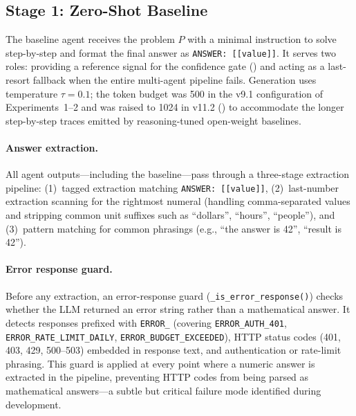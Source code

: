 \documentclass[11pt,a4paper]{article}
\begin{document}
\subsection{Stage 1: Zero-Shot Baseline}
\label{sec:baseline}
The baseline agent receives the problem $P$ with a minimal instruction to solve step-by-step and format the final answer as \texttt{ANSWER:~[[value]]}.
It serves two roles: providing a reference signal for the confidence gate () and acting as a last-resort fallback when the entire multi-agent pipeline fails.
Generation uses temperature $\tau=0.1$; the token budget was 500 in the v9.1 configuration of Experiments~1--2 and was raised to 1024 in v11.2 () to accommodate the longer step-by-step traces emitted by reasoning-tuned open-weight baselines.
\paragraph{Answer extraction.}
All agent outputs---including the baseline---pass through a three-stage extraction pipeline:
(1)~tagged extraction matching \texttt{ANSWER:~[[value]]},
(2)~last-number extraction scanning for the rightmost numeral (handling comma-separated values and stripping common unit suffixes such as ``dollars'', ``hours'', ``people''), and
(3)~pattern matching for common phrasings (e.g., ``the answer is 42'', ``result is 42'').
\paragraph{Error response guard.}
Before any extraction, an error-response guard (\texttt{\_is\_error\_response()}) checks whether the LLM returned an error string rather than a mathematical answer.
It detects responses prefixed with \texttt{ERROR\_} (covering \texttt{ERROR\_AUTH\_401}, \texttt{ERROR\_RATE\_LIMIT\_DAILY}, \texttt{ERROR\_BUDGET\_EXCEEDED}), HTTP status codes (401, 403, 429, 500--503) embedded in response text, and authentication or rate-limit phrasing.
This guard is applied at every point where a numeric answer is extracted in the pipeline, preventing HTTP codes from being parsed as mathematical answers---a subtle but critical failure mode identified during development.
\end{document}
